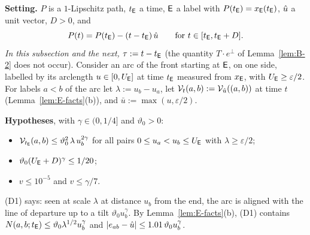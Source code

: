 \noindent\textbf{Setting.} $P$ is a $1$-Lipschitz path, $t_{\mathsf E}$ a time, $\mathsf E$ a label with $P(t_{\mathsf E})=x_{\mathsf E}(t_{\mathsf E})$, $\hat u$ a unit
vector, $D>0$, and
\[
P(t)=P(t_{\mathsf E})-(t-t_{\mathsf E})\,\hat u\qquad\text{for }t\in[t_{\mathsf E},t_{\mathsf E}+D].
\]
\emph{In this subsection and the next, $\tau:=t-t_{\mathsf E}$} (the quantity $T\cdot e^\perp$ of Lemma~\ref{lem:B-2} does not occur).
Consider an arc of the front starting at $\mathsf E$, on one side, labelled by its arclength $u\in[0,U_{\mathsf E}]$ at time $t_{\mathsf E}$ measured from
$x_{\mathsf E}$, with $U_{\mathsf E}\ge\varepsilon/2$. For labels $a<b$ of the arc let $\lambda:=u_b-u_a$, let $\mathcal V_t(a,b):=\mathcal V_{\hat u}((a,b))$ at
time $t$ (Lemma~\ref{lem:E-facts}(b)), and $\bar u:=\max(u,\varepsilon/2)$.

\medskip\noindent\textbf{Hypotheses}, with $\gamma\in(0,1/4]$ and $\vartheta_0>0$:
\begin{itemize}
\item[(D1)] $\mathcal V_{t_{\mathsf E}}(a,b)\le\vartheta_0^2\,\lambda\,u_b^{2\gamma}$ for all pairs $0\le u_a<u_b\le U_{\mathsf E}$ with
$\lambda\ge\varepsilon/2$;
\item[(D2)] $\vartheta_0(U_{\mathsf E}+D)^\gamma\le1/20$;
\item[(D3)] $v\le10^{-5}$ and $v\le\gamma/7$.
\end{itemize}
(D1) says: seen at scale $\lambda$ at distance $u_b$ from the end, the arc is aligned with the line of departure up to a tilt
$\vartheta_0u_b^\gamma$. By Lemma~\ref{lem:E-facts}(b), (D1) contains $N(a,b;t_{\mathsf E})\le\vartheta_0\lambda^{1/2}u_b^\gamma$ and
$|e_{ab}-\hat u|\le1.01\,\vartheta_0u_b^\gamma$.

